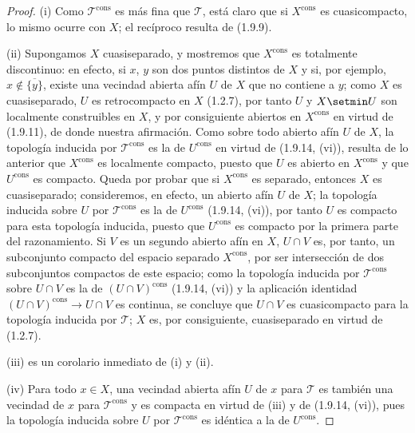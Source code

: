\begin{proof}
(i) Como $\mathscr T^{\mathrm{cons}}$ es más fina que $\mathscr T$, está
claro que si $X^{\mathrm{cons}}$ es cuasicompacto, lo mismo ocurre con $X$;
el recíproco resulta de (1.9.9).

(ii) Supongamos $X$ cuasiseparado, y mostremos que $X^{\mathrm{cons}}$ es
totalmente discontinuo: en efecto, si $x$, $y$ son dos puntos distintos de
$X$ y si, por ejemplo, $x\notin\overline{\{y\}}$, existe una
vecindad abierta afín $U$ de $X$ que no contiene a $y$; como $X$ es
cuasiseparado, $U$ es retrocompacto en $X$ (1.2.7), por tanto $U$ y $X\setmin U$ son
localmente construibles en $X$, y por consiguiente abiertos en
$X^{\mathrm{cons}}$ en virtud de (1.9.11), de donde nuestra afirmación. Como sobre todo
abierto afín $U$ de $X$, la topología inducida por $\mathscr T^{\mathrm{cons}}$
es la de $U^{\mathrm{cons}}$ en virtud de (1.9.14, (vi)), resulta de lo
anterior que $X^{\mathrm{cons}}$ es localmente compacto, puesto que $U$ es
abierto en $X^{\mathrm{cons}}$ y que $U^{\mathrm{cons}}$ es compacto. Queda por
probar que si $X^{\mathrm{cons}}$ es separado, entonces $X$ es cuasiseparado;
consideremos, en efecto, un abierto afín $U$ de $X$; la topología inducida sobre
$U$ por $\mathscr T^{\mathrm{cons}}$ es la de $U^{\mathrm{cons}}$
(1.9.14, (vi)), por tanto $U$ es compacto para esta topología inducida, puesto que
$U^{\mathrm{cons}}$ es compacto por la primera parte del razonamiento. Si
$V$ es un segundo abierto afín en $X$, $U\cap V$ es, por tanto, un subconjunto
compacto del espacio separado $X^{\mathrm{cons}}$, por ser intersección de dos
subconjuntos compactos de este espacio; como la topología inducida por
$\mathscr T^{\mathrm{cons}}$ sobre $U\cap V$ es la de
$(U\cap V)^{\mathrm{cons}}$ (1.9.14, (vi)) y la aplicación identidad
$(U\cap V)^{\mathrm{cons}}\to U\cap V$ es continua, se concluye que
$U\cap V$ es cuasicompacto para la topología inducida por $\mathscr T$; $X$
es, por consiguiente, cuasiseparado en virtud de (1.2.7).

(iii) es un corolario inmediato de (i) y (ii).

(iv) Para todo $x\in X$, una vecindad abierta afín $U$ de $x$ para
$\mathscr T$ es también una vecindad de $x$ para $\mathscr T^{\mathrm{cons}}$
y es compacta en virtud de (iii) y de (1.9.14, (vi)), pues la topología inducida
sobre $U$ por $\mathscr T^{\mathrm{cons}}$ es idéntica a la de
$U^{\mathrm{cons}}$.


\end{proof}
